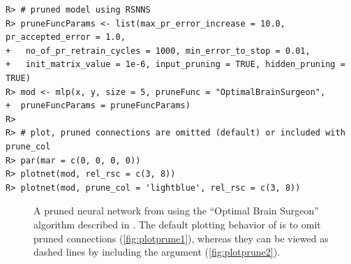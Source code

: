 \documentclass[article,shortnames]{jss}\usepackage[]{graphicx}\usepackage[]{color}
\makeatletter
\newenvironment{kframe}{%
 \def\at@end@of@kframe{}%
 \ifinner\ifhmode%
  \def\at@end@of@kframe{\end{minipage}}%
  \begin{minipage}{\columnwidth}%
 \fi\fi%
 \def\FrameCommand##1{\hskip\@totalleftmargin \hskip-\fboxsep
 \colorbox{shadecolor}{##1}\hskip-\fboxsep
     \hskip-\linewidth \hskip-\@totalleftmargin \hskip\columnwidth}%
 \MakeFramed {\advance\hsize-\width
   \@totalleftmargin\z@ \linewidth\hsize
   \@setminipage}}%
 {\par\unskip\endMakeFramed%
 \at@end@of@kframe}
\newenvironment{knitrout}{}{} %
\makeatother
\begin{document}
\begin{knitrout}
\color{fgcolor}\begin{kframe}
\begin{verbatim}
R> # pruned model using RSNNS
R> pruneFuncParams <- list(max_pr_error_increase = 10.0, pr_accepted_error = 1.0,
+   no_of_pr_retrain_cycles = 1000, min_error_to_stop = 0.01, 
+   init_matrix_value = 1e-6, input_pruning = TRUE, hidden_pruning = TRUE)
R> mod <- mlp(x, y, size = 5, pruneFunc = "OptimalBrainSurgeon",
+  pruneFuncParams = pruneFuncParams)
R> 
R> # plot, pruned connections are omitted (default) or included with prune_col
R> par(mar = c(0, 0, 0, 0))
R> plotnet(mod, rel_rsc = c(3, 8))
R> plotnet(mod, prune_col = 'lightblue', rel_rsc = c(3, 8))
\end{verbatim}
\end{kframe}\begin{figure}[!ht]

{\centering {}

}

\caption{A pruned neural network from  \citep{Bergmeir12} using the ``Optimal Brain Surgeon'' algorithm described in \citet{Zell98}.  The default plotting behavior of  is to omit pruned connections (\ref{fig:plotprune1}), whereas they can be viewed as dashed lines by including the  argument (\ref{fig:plotprune2}).}\label{fig:plotprune}
\end{figure}


\end{knitrout}
\end{document}
